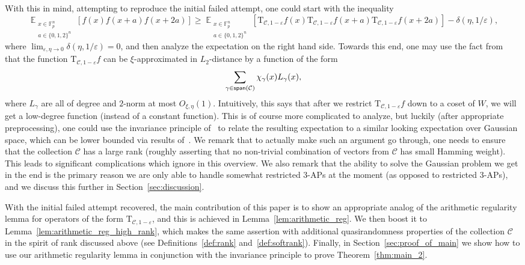 \documentclass[10pt,a4paper]{amsart}
\newcommand\Expect[2]{{\mathop{\mathbb{E}}_{#1}\left[ {#2} \right]}}
\newcommand\eps{\varepsilon}
\renewcommand\geq{\geqslant}
\begin{document}
With this in mind, attempting to reproduce the initial failed attempt, one could start with the inequality
\[
\Expect{\substack{x\in\mathbb{F}_p^n\\a\in\{0,1,2\}^n}}{f(x)f(x+a)f(x+2a)}
\geq 
\Expect{\substack{x\in\mathbb{F}_p^n\\a\in\{0,1,2\}^n}}{\mathrm{T}_{\mathcal{C},1-\eps}f(x)\mathrm{T}_{\mathcal{C},1-\eps}f(x+a)\mathrm{T}_{\mathcal{C},1-\eps}f(x+2a)}
-\delta(\eta,1/\eps),
\]
where $\lim_{\eps,\eta\rightarrow 0}\delta(\eta,1/\eps)=0$, and then analyze the expectation on the right hand side. Towards this end, one may use the fact from~\cite{BKM5} that the function $\mathrm{T}_{\mathcal{C},1-\eps}f$ can be $\xi$-approximated in $L_2$-distance by a function of the form
\[
\sum\limits_{\gamma\in{\sf span}(\mathcal{C})}\chi_{\gamma}(x) L_{\gamma}(x),
\]
where $L_{\gamma}$ are all of degree and $2$-norm at most $O_{\xi,\eta}(1)$. Intuitively, this says that after we restrict $\mathrm{T}_{\mathcal{C},1-\eps}f$ down to a coset of $W$, we will get a low-degree function (instead of a constant function). This is of course more complicated to analyze, but luckily (after appropriate preprocessing), one could use the invariance principle of~\cite{MOO} to relate the resulting expectation to a similar looking expectation over Gaussian space, which can be lower bounded via results of~\cite{ChenDafnisPaouris2015HolderGaussian}. We remark that to actually make such an argument go through, one needs to ensure that the collection $\mathcal{C}$ has a large rank (roughly asserting that no non-trivial combination of vectors from $\mathcal{C}$ has small Hamming weight). This leads to significant complications which ignore in this overview. We also remark that the ability to solve the Gaussian problem we get in the end is the primary reason we are only able to handle somewhat restricted $3$-APs at the moment (as opposed to restricted $3$-APs), and we discuss this further in Section~\ref{sec:discussion}.

With the initial failed attempt recovered, the main contribution of this paper is to show an appropriate analog of the arithmetic regularity lemma for operators of the form $\mathrm{T}_{\mathcal{C},1-\eps}$, and this is achieved in Lemma~\ref{lem:arithmetic_reg}. We then boost it to Lemma~\ref{lem:arithmetic_reg_high_rank}, which makes the same assertion with additional quasirandomness properties of the collection $\mathcal{C}$ in the spirit of rank discussed above (see Definitions~\ref{def:rank} and~\ref{def:softrank}). Finally, in Section~\ref{sec:proof_of_main} we show how to use our arithmetic regularity lemma in conjunction with the invariance principle to prove Theorem~\ref{thm:main_2}.
\end{document}
